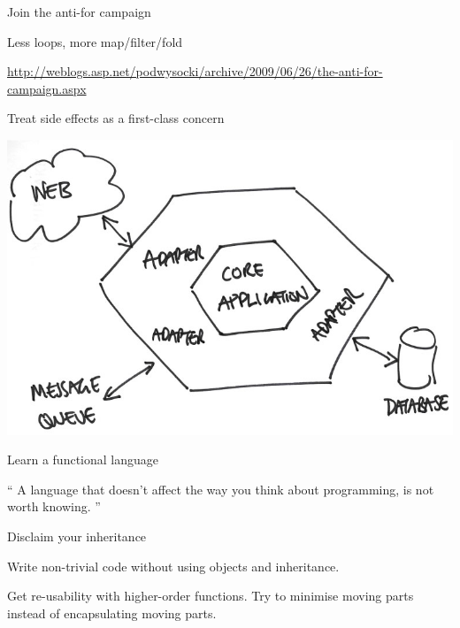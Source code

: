 \documentclass[mathserif]{beamer}
\begin{document}
\begin{frame}{Join the anti-for campaign}

  \begin{center}
    {\Huge Less loops, more map/filter/fold}
  \end{center}
  \vskip5mm
  \url{http://weblogs.asp.net/podwysocki/archive/2009/06/26/the-anti-for-campaign.aspx}

\end{frame}

\begin{frame}{Treat side effects as a first-class concern}

  \begin{center}
    \includegraphics[scale=0.3]{img/hexagonal_architecture_sketch.jpg}
  \end{center}

\end{frame}

\begin{frame}{Learn a functional language}

\begin{exampleblock}{}
  {\Large ``
    A language that doesn't affect the way you think about programming, is not worth knowing.
  ''}
  \vskip5mm
  \hspace*{}
\end{exampleblock}

\end{frame}

\begin{frame}{Disclaim your inheritance}

  {\Huge Write non-trivial code without using objects and inheritance.}
  \vskip5mm

  {\Large Get \alert{re-usability} with higher-order functions.}
  \vskip2mm
  {\Large Try to \alert{minimise moving parts} instead of encapsulating moving parts.}
  {\small\cite{mfeathers}}

\end{frame}
\end{document}
